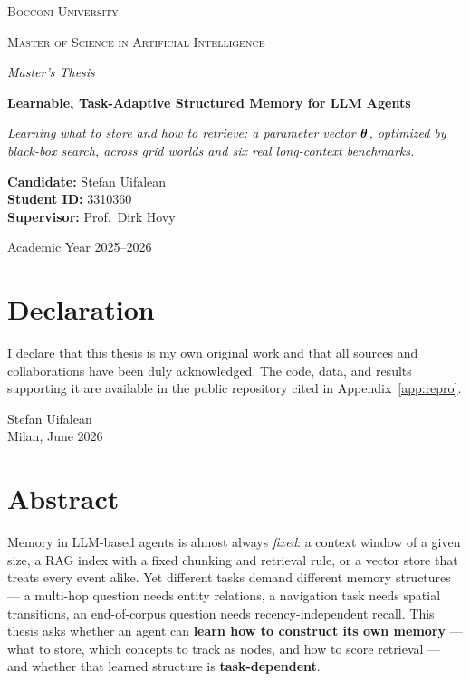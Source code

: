 \begin{titlepage}
\centering
{\scshape\large Bocconi University \par}
\vspace{4pt}
{\scshape Master of Science in Artificial Intelligence
\par}
\vspace{40pt}
{\large\itshape Master's Thesis \par}
\vspace{30pt}
{\Huge\bfseries Learnable, Task-Adaptive Structured Memory for LLM Agents \par}
\vspace{18pt}
{\large\itshape Learning \emph{what to store} and \emph{how to retrieve}:
a parameter vector $\boldsymbol{\theta}$, optimized by black-box search,
across grid worlds and six real long-context benchmarks. \par}
\vspace{50pt}
{\large
\textbf{Candidate:} Stefan Uifalean \\[4pt]
\textbf{Student ID:} 3310360 \\[4pt]
\textbf{Supervisor:} Prof.\ Dirk Hovy \par}
\vfill
{\large Academic Year 2025--2026 \par}
\end{titlepage}

\cleardoublepage
\thispagestyle{empty}
\section*{Declaration}
\noindent I declare that this thesis is my own original work and that all sources
and collaborations have been duly acknowledged. The code, data, and results
supporting it are available in the public repository cited in
Appendix~\ref{app:repro}.
\vspace{20pt}

\noindent Stefan Uifalean \\
Milan, June 2026

\cleardoublepage
\thispagestyle{empty}
\section*{Abstract}
\noindent
Memory in LLM-based agents is almost always \emph{fixed}: a context window of a
given size, a RAG index with a fixed chunking and retrieval rule, or a vector
store that treats every event alike. Yet different tasks demand different memory
structures --- a multi-hop question needs entity relations, a navigation task
needs spatial transitions, an end-of-corpus question needs recency-independent
recall. This thesis asks whether an agent can \textbf{learn how to construct its
own memory} --- what to store, which concepts to track as nodes, and how to
score retrieval --- and whether that learned structure is \textbf{task-dependent}.

